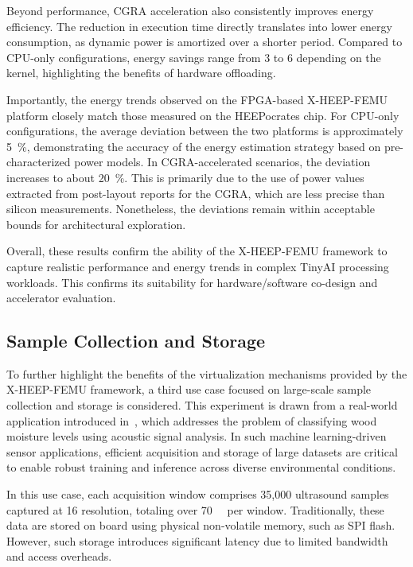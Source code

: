             Beyond performance, CGRA acceleration also consistently improves energy efficiency. The reduction in execution time directly translates into lower energy consumption, as dynamic power is amortized over a shorter period. Compared to CPU-only configurations, energy savings range from \SI{3}{\times} to \SI{6}{\times} depending on the kernel, highlighting the benefits of hardware offloading.
            
            Importantly, the energy trends observed on the FPGA-based \mbox{X-HEEP-FEMU} platform closely match those measured on the \mbox{HEEPocrates} chip. For CPU-only configurations, the average deviation between the two platforms is approximately \SI{5}{\percent}, demonstrating the accuracy of the energy estimation strategy based on pre-characterized power models. In CGRA-accelerated scenarios, the deviation increases to about \SI{20}{\percent}. This is primarily due to the use of power values extracted from post-layout reports for the CGRA, which are less precise than silicon measurements. Nonetheless, the deviations remain within acceptable bounds for architectural exploration.
            
            Overall, these results confirm the ability of the \mbox{X-HEEP-FEMU} framework to capture realistic performance and energy trends in complex TinyAI processing workloads. This confirms its suitability for hardware/software co-design and accelerator evaluation.
    
        \subsection{Sample Collection and Storage}
        
            To further highlight the benefits of the virtualization mechanisms provided by the \mbox{X-HEEP-FEMU} framework, a third use case focused on large-scale sample collection and storage is considered. This experiment is drawn from a real-world application introduced in~\cite{moisture}, which addresses the problem of classifying wood moisture levels using acoustic signal analysis. In such machine learning-driven sensor applications, efficient acquisition and storage of large datasets are critical to enable robust training and inference across diverse environmental conditions.
            
            In this use case, each acquisition window comprises 35,000 ultrasound samples captured at \SI{16}{\bit} resolution, totaling over \SI{70}{\kibi\byte} per window. Traditionally, these data are stored on board using physical non-volatile memory, such as SPI flash. However, such storage introduces significant latency due to limited bandwidth and access overheads.


